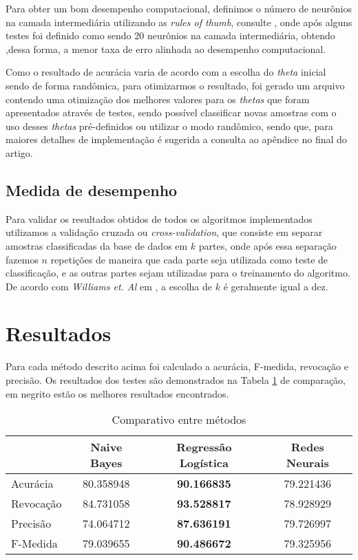 \documentclass[10pt, conference, compsocconf]{IEEEtran}
\begin{document}
Para obter um bom desempenho computacional, definimos o número de neurônios na camada intermediária utilizando as \textit{rules of thumb}, consulte \cite{12}, onde após alguns testes foi definido como sendo 20 neurônios na camada intermediária, obtendo ,dessa forma, a menor taxa de erro alinhada ao desempenho computacional.

Como o resultado de acurácia varia de acordo com a escolha do \textit{theta} inicial sendo de forma randômica, para otimizarmos o resultado, foi gerado um arquivo contendo uma otimização dos melhores valores para os \textit{thetas} que foram apresentados através de testes, sendo possível classificar novas amostras com o uso desses \textit{thetas} pré-definidos ou utilizar o modo randômico, sendo que, para maiores detalhes de implementação é sugerida a consulta ao apêndice no final do artigo.

\subsection{Medida de desempenho}
Para validar os resultados obtidos de todos os algoritmos implementados utilizamos a validação cruzada ou \textit{cross-validation}, que consiste em separar amostras classificadas da base de dados em $k$ partes, onde após essa separação fazemos $n$ repetições de maneira que cada parte seja utilizada como teste de classificação, e as outras partes sejam utilizadas para o treinamento do algoritmo. De acordo com \textit{Williams et. Al} em \cite{10}, a escolha de $k$ é geralmente igual a dez.


\section{Resultados}\label{resultados}
Para cada método descrito acima foi calculado a acurácia, F-medida, revocação e precisão. Os resultados dos testes são demonstrados na Tabela \ref{table:table_comparacao} de comparação, em negrito estão os melhores resultados encontrados.
\\
\begin{table}[!htpb]
\begin{small} 
\centering
\begin{tabular}{lccc}
\hline
                 & Naive Bayes & Regressão Logística  & Redes Neurais \\
\hline
Acurácia    & 80.358948  &\textbf{90.166835} & 79.221436 \\
Revocação & 84.731058  & \textbf{93.528817} & 78.928929\\
Precisão    & 74.064712  & \textbf{87.636191} & 79.726997\\
F-Medida   & 79.039655  & \textbf{90.486672}  & 79.325956\\
\hline
\end{tabular}
\caption{Comparativo entre métodos}
\label{table:table_comparacao}
\end{small}
\end{table} 
\end{document}
